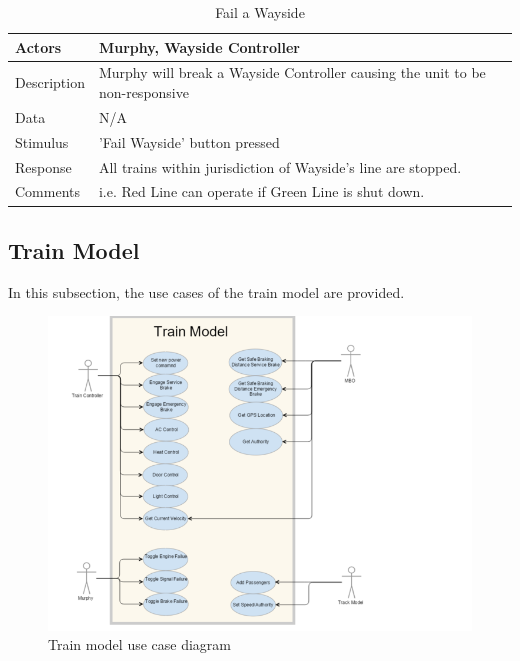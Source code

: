 \documentclass[]{article}
\begin{document}
\begin{table}[H]
	\centering
	\caption{Fail a Wayside}
	\begin{tabular}{|l|l|}
		\hline
		Actors & \parbox[t]{10cm}{Murphy, Wayside Controller} \\ \hline
		Description & \parbox[t]{10cm}{Murphy will break a Wayside Controller causing the unit to be non-responsive} \\ \hline
		Data &  \parbox[t]{10cm}{N/A} \\ \hline
		Stimulus &  \parbox[t]{10cm}{ 'Fail Wayside' button pressed} \\ \hline
		Response & \parbox[t]{10cm}{All trains within jurisdiction of Wayside's line are stopped.}\\ \hline
		Comments & \parbox[t]{10cm}{i.e. Red Line can operate if Green Line is shut down.}  \\ \hline
	\end{tabular}
\end{table}
\subsection{Train Model}
In this subsection, the use cases of the train model are provided.

\begin{figure}[H]
	\centering
	\includegraphics[scale=.3]{trainmodelusecase.png}
	\caption{Train model use case diagram}
\end{figure}
   
\end{document}
